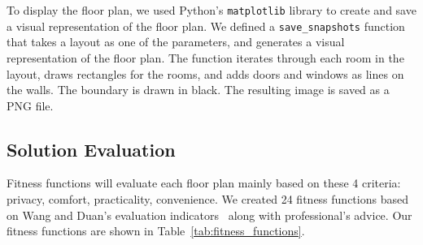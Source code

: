 \documentclass[]{article}
\begin{document}
To display the floor plan, we used Python's \texttt{matplotlib} library to create and save a visual representation of the floor plan. We defined a \texttt{save\_snapshots} function that takes a layout as one of the parameters, and generates a visual representation of the floor plan. The function iterates through each room in the layout, draws rectangles for the rooms, and adds doors and windows as lines on the walls. The boundary is drawn in black. The resulting image is saved as a PNG file.

\subsection{Solution Evaluation}
Fitness functions will evaluate each floor plan mainly based on these 4 criteria:
privacy, comfort, practicality, convenience. We created 24 fitness functions based on Wang and Duan's evaluation indicators~\cite{WANG2023100238} along with professional's advice. Our fitness functions are shown in Table~\ref{tab:fitness_functions}.
\end{document}
